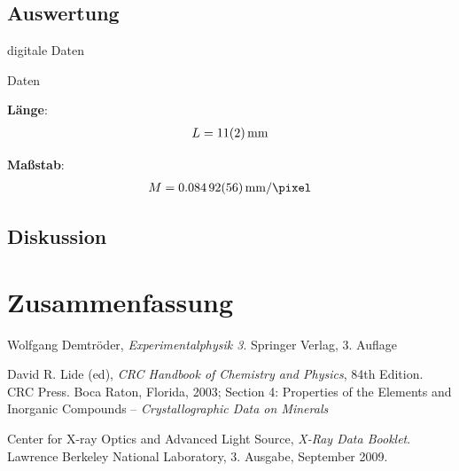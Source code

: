\documentclass[10pt, a4paper]{article}
\begin{document}
\subsection{Auswertung}
\begin{table}[h]
\centering

\caption{digitale Daten}
\label{tab:laue_digi}
\end{table}

\begin{table}[h]
\centering

\caption{Daten}
\label{tab:laue_mm}
\end{table}


\textbf{Länge}:
\begin{align}
  L = \SI{11 +- 2}{\milli\metre}
\end{align}

\textbf{Maßstab}:
\begin{align}
  M = \SI{0.08492 +- 0.00056}{\milli\metre\per\pixel}
\end{align}


\subsection{Diskussion}


\section{Zusammenfassung}

\begin{figure}
\centering

\end{figure}

\begin{figure}
\centering

\end{figure}


\begin{thebibliography}{9}
	Wolfgang Demtröder,
	\emph{Experimentalphysik 3}.
	Springer Verlag,
	3. Auflage

  David R. Lide (ed),
  \emph{CRC Handbook of Chemistry and Physics},
  84th Edition. CRC Press. Boca Raton, Florida, 2003;
  Section 4: Properties of the Elements and Inorganic Compounds --
  \emph{Crystallographic Data on Minerals}

  Center for X-ray Optics and Advanced Light Source,
  \emph{X-Ray Data Booklet}.
  Lawrence Berkeley National Laboratory,
  3. Ausgabe,
  September 2009.
\end{thebibliography}

\newpage

\begin{appendix}

\end{appendix}
\end{document}
